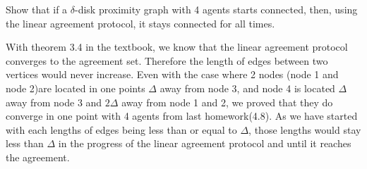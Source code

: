 \documentclass{article}
\begin{document}
\begin{problem}
Show that if a $\delta$-disk proximity graph with 4 agents starts connected, then, using the linear agreement protocol, it stays connected for all times.

With theorem 3.4  in the textbook, we know that the linear agreement protocol converges to the agreement set. Therefore the length of edges between two vertices would never increase. Even with the case where 2 nodes (node 1 and node 2)are located in one points $\Delta$ away from node 3, and node 4 is located $\Delta$ away from node 3 and $2 \Delta$ away from node 1 and 2, we proved that they do converge in one point with 4 agents from last homework(4.8). As we have started with each lengths of edges being less than or equal to $\Delta$, those lengths would stay less than $\Delta$ in the progress of the linear agreement protocol and until it reaches the agreement. 


\end{problem}
\end{document}
